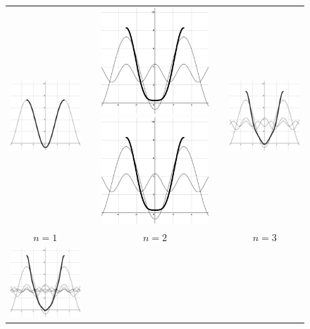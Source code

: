 \documentclass[11pt]{amsart}
\theoremstyle{plain}
\theoremstyle{definition}
\begin{document}
\begin{figure}[ht!]
\centering
\begin{tabular}{ccc}
  \includegraphics[width=40mm]{Images/simple_1.png} &
  \includegraphics[width=40mm]{Images/simple_2.png}
  \includegraphics[width=40mm]{Images/simple_2.png} &
  \includegraphics[width=40mm]{Images/simple_3.png} \\
  $n=1$ & $n=2$ & $n=3$\\[6pt]
  \includegraphics[width=40mm]{Images/simple_5.png} &

\end{tabular}
\end{figure}
\end{document}
